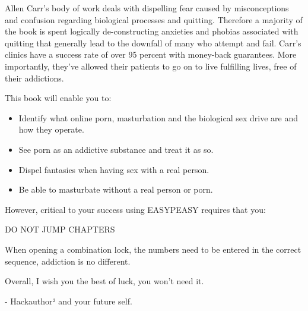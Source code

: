 \documentclass[easypeasy.tex]{subfiles}
\begin{document}
Allen Carr's body of work deals with dispelling fear caused by misconceptions and confusion regarding biological processes and quitting. Therefore a majority of the book is spent logically de-constructing anxieties and phobias associated with quitting that generally lead to the downfall of many who attempt and fail. Carr's clinics have a success rate of over 95 percent with money-back guarantees. More importantly, they've allowed their patients to go on to live fulfilling lives, free of their addictions.

This book will enable you to:
\begin{itemize}
  \item Identify what online porn, masturbation and the biological sex drive are and how they operate.
  \item See porn as an addictive substance and treat it as so.
  \item Dispel fantasies when having sex with a real person.
  \item Be able to masturbate without a real person or porn.
\end{itemize}

However, critical to your success using EASYPEASY requires that you:

{\huge DO NOT JUMP CHAPTERS}

When opening a combination lock, the numbers need to be entered in the correct sequence, addiction is no different.

Overall, I wish you the best of luck, you won't need it.

- Hackauthor² and your future self.
\newpage
\tableofcontents
\end{document}
